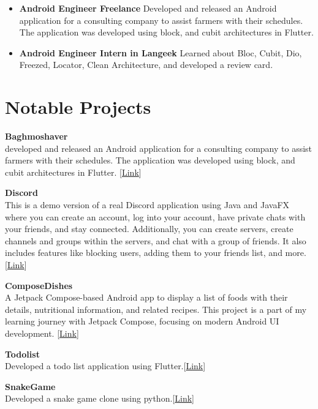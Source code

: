 \documentclass[a4paper,10pt]{article} %
\begin{document}
\begin{itemize}
    \item \textbf{Android Engineer Freelance } Developed and released an Android application for a consulting company to assist farmers with their schedules. The application was developed using block, and cubit architectures in Flutter. 
    \item \textbf{Android Engineer Intern in Langeek} Learned about Bloc, Cubit, Dio, Freezed, Locator, Clean Architecture, and developed a review card.
\end{itemize}


\section{Notable Projects}  

\begin{small}

\textbf{Baghmoshaver}\\
developed and released an Android application for a consulting company to assist farmers with their schedules. The application was developed using block, and cubit architectures in Flutter. [\href{https://cafebazaar.ir/app/com.example.bagh_moshaver}{Link}]
\end{small}

\textbf{Discord}\\
This is a demo version of a real Discord application using Java and JavaFX where you can create an account, log into
your account, have private chats with your friends, and stay connected. Additionally, you can
create servers, create channels and groups within the servers, and chat with a group of friends. It also
includes features like blocking users, adding them to your friends list, and more.
[\href{https://github.com/Aliamrol/Discord}{Link}]

\textbf{ComposeDishes}\\
A Jetpack Compose-based Android app to display a list of foods with their details, nutritional information, and related recipes. This project is a part of my learning journey with Jetpack Compose, focusing on modern Android UI development.
[\href{https://github.com/Aliamrol/ComposeDishes}{Link}]

\textbf{Todolist}\\
Developed a todo list application using Flutter.[\href{https://github.com/Aliamrol/Task_Manager}{Link}]

\textbf{SnakeGame}\\
Developed a snake game clone using python.[\href{https://github.com/Aliamrol/SnakeGame}{Link}]
\end{document}
